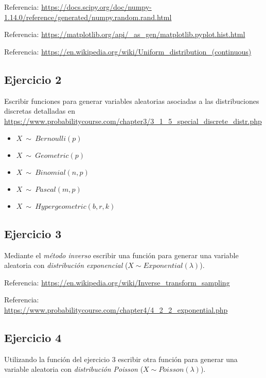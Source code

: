 \documentclass[a4paper]{article}
\begin{document}
\bigskip

Referencia: 
\url{https://docs.scipy.org/doc/numpy-1.14.0/reference/generated/numpy.random.rand.html}

\smallskip

Referencia: 
\url{https://matplotlib.org/api/_as_gen/matplotlib.pyplot.hist.html}

\smallskip

Referencia: 
\url{https://en.wikipedia.org/wiki/Uniform_distribution_(continuous)}

\subsection{Ejercicio 2}

Escribir funciones para generar variables aleatorias asociadas a las 
distribuciones discretas detalladas en 
\url{https://www.probabilitycourse.com/chapter3/3_1_5_special_discrete_distr.php}

\begin{itemize}
\item $X \ \sim \ Bernoulli(p)$
\item $X \ \sim \ Geometric(p)$
\item $X \ \sim \ Binomial(n,p)$
\item $X \ \sim \ Pascal(m,p)$
\item $X \ \sim \ Hypergeometric(b,r,k)$
\end{itemize}

\subsection{Ejercicio 3}

Mediante el \emph{método inverso} escribir una función para 
generar una variable aleatoria con \emph{distribución exponencial} ($X 
\sim Exponential(\lambda)$).


\bigskip

Referencia: \url{https://en.wikipedia.org/wiki/Inverse_transform_sampling}

\smallskip

Referencia: 
\url{https://www.probabilitycourse.com/chapter4/4_2_2_exponential.php} 

\subsection{Ejercicio 4}

Utilizando la función del ejercicio 3 escribir otra función para 
generar una variable aleatoria con \emph{distribución Poisson} ($X 
\sim Poisson(\lambda)$).
\end{document}
